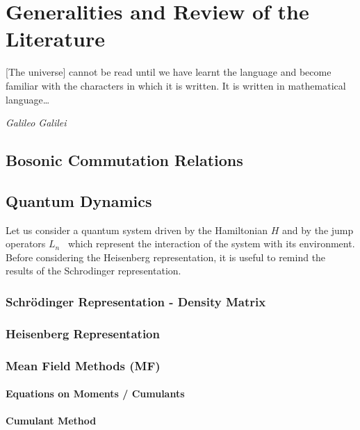 \documentclass[a4paper,11pt,english]{report}
\begin{document}
\chapter{Generalities and Review of the Literature} \label{generalities-chapter}
\epigraph{[The universe] cannot be read until we have learnt the language and become familiar with the characters in which it is written. It is written in mathematical language\ldots}{\textit{Galileo Galilei}}
    \section{Bosonic Commutation Relations}
    

    \section{Quantum Dynamics}
    Let us consider a quantum system driven by the Hamiltonian $H$ and by the jump operators $L_n$~\cite{explo_quant} which represent the interaction of the system with its environment. Before considering the Heisenberg representation, it is useful to remind the results of the Schrodinger representation.
        \subsection{Schrödinger Representation - Density Matrix}
            \label{schro-pic}
            
        \subsection{Heisenberg Representation} \label{intro-heis-rep}
            
        \subsection{Mean Field Methods (MF)} \label{intro-MF}
        \subsubsection{Equations on Moments / Cumulants}
            
        \subsubsection{Cumulant Method} \label{cumulant-method}
            
\end{document}
